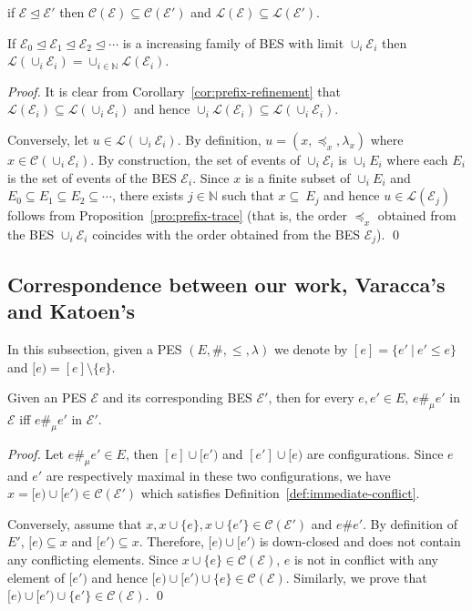 \documentclass{llncs}
\newcommand{\C}{\mathcal{C}}
\renewcommand{\L}{\mathcal{L}}
\newcommand{\N}{\mathbb{N}}
\newcommand{\EE}{\mathcal{E}}
\newcommand{\prefix}{\trianglelefteq}
\newcommand{\<}{\langle}
\renewcommand{\>}{\rangle}
\begin{document}
\begin{corollary}\label{cor:prefix-refinement}
if $\EE\prefix\EE'$ then $\C(\EE) \subseteq \C(\EE')$ and $\L(\EE)\subseteq\L(\EE')$.
\end{corollary}

\begin{corollary}\label{cor:limit-lposet}
If $\EE_0\prefix\EE_1\prefix\EE_2\prefix\cdots$ is a increasing family of BES with limit $\cup_i\EE_i$ then $\L(\cup_i\EE_i) = \cup_{i\in\N}\L(\EE_i)$.
\end{corollary}

\begin{proof}
It is clear from Corollary~\ref{cor:prefix-refinement} that $\L(\EE_i)\subseteq\L(\cup_i\EE_i)$ and hence $\cup_i\L(\EE_i)\subseteq\L(\cup_i\EE_i)$.

Conversely, let $u\in\L(\cup_i\EE_i)$. By definition, $u = (x,\preceq_x,\lambda_x)$ where $x\in\C(\cup_i\EE_i)$. By construction, the set of events of $\cup_i\EE_i$ is $ \cup_i E_i$ where each $E_i$ is the set of events of the BES $\EE_i$. Since $x$ is a finite subset of $\cup_iE_i$ and $E_0\subseteq E_1\subseteq E_2\subseteq\cdots$, there exists $j\in\N$ such that $x\subseteq\ E_j$ and hence $u\in\L(\EE_j)$ follows from Proposition~\ref{pro:prefix-trace} (that is, the order $\preceq_x$ obtained from the BES $\cup_i\EE_i$ coincides with the order obtained from the BES $\EE_j$). \qed
\end{proof}

\subsection{Correspondence between our work, Varacca's and Katoen's}

In this subsection, given a PES $(E,\#,\leq,\lambda)$ we denote by $[e] = \{e' \ |\ e'\leq e\}$ and $[e) = [e]\setminus\{e\}$.

\begin{proposition}\label{pro:immediate-conflict}
Given an PES $\EE$ and its corresponding BES $\EE'$, then for every $e,e'\in E$, $e\#_\mu e'$ in $\EE$ iff $e\#_\mu e'$ in $\EE'$.
\end{proposition}

\begin{proof}
Let $e\#_\mu e'\in E$, then $[e]\cup[e')$ and $[e']\cup[e)$ are configurations. Since $e$ and $e'$ are respectively maximal in these two configurations, we have $x = [e)\cup[e')\in\C(\EE')$ which satisfies Definition~\ref{def:immediate-conflict}.

Conversely, assume that $x,x\cup\{e\},x\cup\{e'\}\in\C(\EE')$ and $e\#e'$. By definition of $E'$, $[e)\subseteq x$ and $[e')\subseteq x$. Therefore, $[e)\cup [e')$ is down-closed and does not contain any conflicting elements. Since $x\cup\{e\}\in\C(\EE)$, $e$ is not in conflict with any element of $[e')$ and hence $[e)\cup[e')\cup\{e\}\in\C(\EE)$. Similarly, we prove that $[e)\cup[e')\cup\{e'\}\in\C(\EE)$. \qed
\end{proof}
\end{document}

